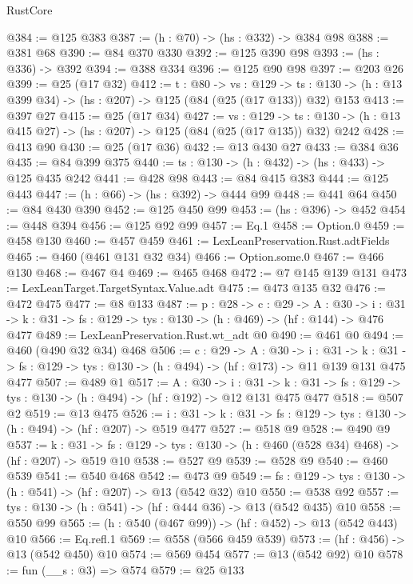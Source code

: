 \begin{lexlean}{RustCore}
\begin{coremodule}
@384 := @125 @383
@387 := (h : @70) -> (hs : @332) -> @384 @98
@388 := @381 @68
@390 := @84 @370 @330
@392 := @125 @390 @98
@393 := (hs : @336) -> @392
@394 := @388 @334
@396 := @125 @90 @98
@397 := @203 @26
@399 := @25 (@17 @32)
@412 := {t : @80} ->
  {vs : @129} ->
  {ts : @130} -> (h : @13 @399 @34) -> (hs : @207) -> @125 (@84 (@25 (@17 @133)) @32) @153
@413 := @397 @27
@415 := @25 (@17 @34)
@427 := {vs : @129} ->
  {ts : @130} -> (h : @13 @415 @27) -> (hs : @207) -> @125 (@84 (@25 (@17 @135)) @32) @242
@428 := @413 @90
@430 := @25 (@17 @36)
@432 := @13 @430 @27
@433 := @384 @36
@435 := @84 @399 @375
@440 := {ts : @130} -> (h : @432) -> (hs : @433) -> @125 @435 @242
@441 := @428 @98
@443 := @84 @415 @383
@444 := @125 @443
@447 := (h : @66) -> (hs : @392) -> @444 @99
@448 := @441 @64
@450 := @84 @430 @390
@452 := @125 @450 @99
@453 := (hs : @396) -> @452
@454 := @448 @394
@456 := @125 @92 @99
@457 := Eq.{1}
@458 := Option.{0}
@459 := @458 @130
@460 := @457 @459
@461 := LexLeanPreservation.Rust.adtFields
@465 := @460 (@461 @131 @32 @34)
@466 := Option.some.{0}
@467 := @466 @130
@468 := @467 @4
@469 := @465 @468
@472 := @7 @145 @139 @131
@473 := LexLeanTarget.TargetSyntax.Value.adt
@475 := @473 @135 @32
@476 := @472 @475
@477 := @8 @133
@487 := {p : @28} ->
  {c : @29} ->
  {A : @30} ->
  {i : @31} -> {k : @31} -> {fs : @129} -> {tys : @130} -> (h : @469) -> (hf : @144) -> @476 @477
@489 := LexLeanPreservation.Rust.wt_adt @0
@490 := @461 @0
@494 := @460 (@490 @32 @34) @468
@506 := {c : @29} ->
  {A : @30} ->
  {i : @31} ->
  {k : @31} -> {fs : @129} -> {tys : @130} -> (h : @494) -> (hf : @173) -> @11 @139 @131 @475 @477
@507 := @489 @1
@517 := {A : @30} ->
  {i : @31} ->
  {k : @31} -> {fs : @129} -> {tys : @130} -> (h : @494) -> (hf : @192) -> @12 @131 @475 @477
@518 := @507 @2
@519 := @13 @475
@526 := {i : @31} ->
  {k : @31} -> {fs : @129} -> {tys : @130} -> (h : @494) -> (hf : @207) -> @519 @477
@527 := @518 @9
@528 := @490 @9
@537 := {k : @31} ->
  {fs : @129} -> {tys : @130} -> (h : @460 (@528 @34) @468) -> (hf : @207) -> @519 @10
@538 := @527 @9
@539 := @528 @9
@540 := @460 @539
@541 := @540 @468
@542 := @473 @9
@549 := {fs : @129} -> {tys : @130} -> (h : @541) -> (hf : @207) -> @13 (@542 @32) @10
@550 := @538 @92
@557 := {tys : @130} -> (h : @541) -> (hf : @444 @36) -> @13 (@542 @435) @10
@558 := @550 @99
@565 := (h : @540 (@467 @99)) -> (hf : @452) -> @13 (@542 @443) @10
@566 := Eq.refl.{1}
@569 := @558 (@566 @459 @539)
@573 := (hf : @456) -> @13 (@542 @450) @10
@574 := @569 @454
@577 := @13 (@542 @92) @10
@578 := fun (__s : @3) => @574
@579 := @25 @133

\end{coremodule}
\end{lexlean}
